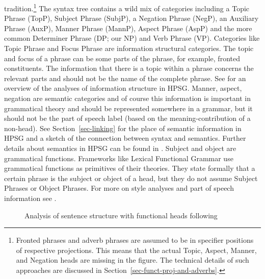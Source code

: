 tradition.\footnote{
  Fronted phrases and adverb phrases are assumed to be in specifier positions of respective
  projections. This means that the actual Topic, Aspect, Manner, and Negation heads are missing in the
  figure. The technical details of such approaches are discussed in Section~\ref{sec-funct-proj-and-adverbs}.
} The syntax tree contains a wild mix of categories including a Topic Phrase (TopP),
Subject Phrase (SubjP), a Negation Phrase (NegP), an Auxiliary Phrase (AuxP), Manner Phrase (MannP),
Aspect Phrase (AspP) and the more common Determiner Phrase (DP; our NP) and Verb Phrase (VP). 
%
Categories like Topic Phrase and Focus Phrase are information structural categories. The
topic and focus of a phrase can be some parts of the phrase, for example, fronted constituents. The
information that there is a topic within a phrase concerns the relevant parts and should not be the name of the complete phrase. See
 for an overview of the analyses of information structure in HPSG. Manner,
aspect, negation are semantic categories and of course this
information is important in grammatical theory and should be represented somewhere in a grammar, but
it should not be the part of speech label (based on the meaning-contribution of a non-head). See Section~\ref{sec-linking} for the place of semantic information in
HPSG and a sketch of the connection between syntax and semantics. Further details about semantics in
HPSG can be found in .
%
Subject
and object are grammatical functions. 
Frameworks like Lexical Functional Grammar use grammatical
functions as primitives of their theories. They state formally that a certain phrase is the subject or object
of a head, but they do not assume Subject Phrases or Object Phrases. For more on \citeauthor{CR2010a} style analyses and part of speech information see .
\begin{figure}
\caption{\label{Abbildung-Remnant-Movement-Satzstruktur}Analysis of sentence structure with functional heads following \citet[]{Laenzlinger2004a}}
\end{figure}%

